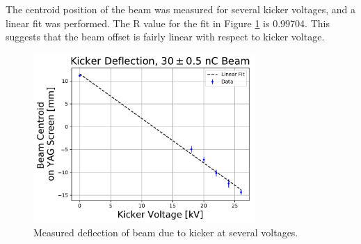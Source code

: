 The centroid position of the beam was measured for several kicker voltages, and a linear fit was performed.
The R value for the fit in Figure \ref{fig:linear} is 0.99704. This suggests that the beam offset 
is fairly linear with respect to kicker voltage. 
\begin{figure}
	\centering
	\includegraphics[width=0.75\textwidth]{./images/kicker_linearity}
	\caption{Measured deflection of beam due to kicker at several voltages.}
	\label{fig:linear}
\end{figure}

